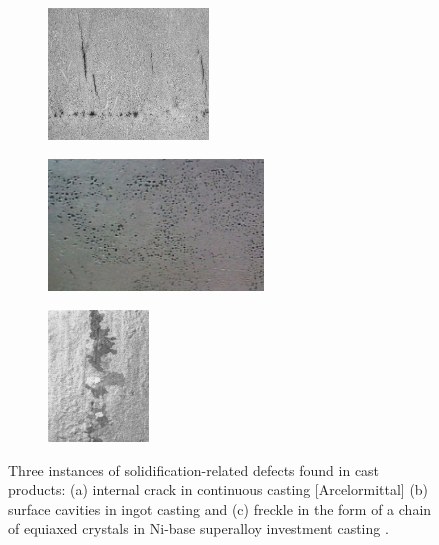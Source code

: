 \begin{figure}[htbp]
\centering
  \begin{subfigure}[t]{0.3\textwidth}
    \centering
	\includegraphics[height=3.5cm]{Chapter0/Graphics/cracks.png}
	\caption{}
    \label{fig:crack}
  \end{subfigure}
   \begin{subfigure}[t]{0.35\textwidth}
    \centering
	\includegraphics[height=3.5cm]{Chapter0/Graphics/porosity5.jpg}
	\caption{}
    \label{fig:porosity}
  \end{subfigure}
   \begin{subfigure}[t]{0.3\textwidth}
    \centering
	\includegraphics[height=3.5cm]{Chapter0/Graphics/freckle4.png} 
	\caption{}
    \label{fig:freckle}
  \end{subfigure}
\caption{Three instances of solidification-related defects found in cast products: 
(a) internal crack in continuous casting [Arcelormittal] (b) surface cavities in ingot casting \citep{carlson_modeling_2002}  
and (c) freckle in the form of a chain of equiaxed crystals in Ni-base superalloy investment casting \citep{giamei_nature_1970}.}
\label{fig:casting}
\end{figure}
%
%
